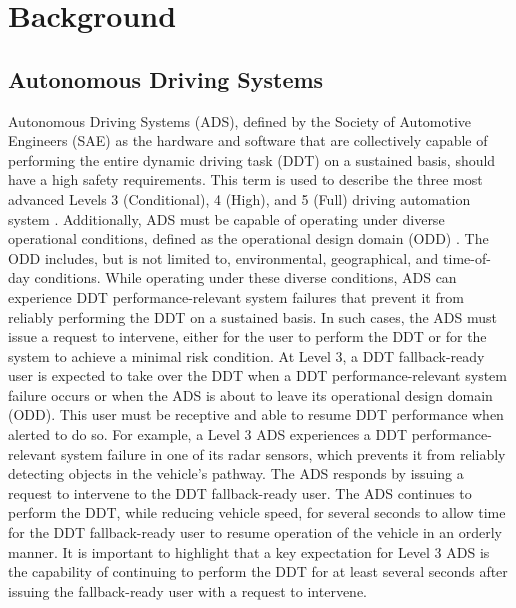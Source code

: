 \section{Background}  \label{Background}



\subsection{Autonomous Driving Systems} \label{Background:AutonomousDrivingSystems}


Autonomous Driving Systems (ADS), defined by the Society of Automotive Engineers (SAE) as the hardware and software that are collectively capable of performing the entire dynamic driving task (DDT) on a sustained basis, should have a high safety requirements.
This term is used to describe the three most advanced Levels 3 (Conditional), 4 (High), and 5 (Full) driving automation system \cite{sae:j3016:2021apr}. Additionally, ADS must be capable of operating under diverse operational conditions, defined as the operational design domain (ODD) \cite{sae:j3016:2021apr}. The ODD includes, but is not limited to, environmental, geographical, and time-of-day conditions.
While operating under these diverse conditions, ADS can experience DDT performance-relevant system failures that prevent it from reliably performing the DDT on a sustained basis.
In such cases, the ADS must issue a request to intervene, either for the user to perform the DDT or for the system to achieve a minimal risk condition.
At Level 3, a DDT fallback-ready user is expected to take over the DDT when a DDT performance-relevant system failure occurs or when the ADS is about to leave its operational design domain (ODD). This user must be receptive and able to resume DDT performance when alerted to do so.
For example, a Level 3 ADS experiences a DDT performance-relevant system failure in one of its radar sensors, which prevents it from reliably detecting objects in the vehicle's pathway. The ADS responds by issuing a request to intervene to the DDT fallback-ready user. The ADS continues to perform the DDT, while reducing vehicle speed, for several seconds to allow time for the DDT fallback-ready user to resume operation of the vehicle in an orderly manner. It is important to highlight that a key expectation for Level 3 ADS is the capability of continuing to perform the DDT for at least several seconds after issuing the fallback-ready user with a request to intervene.
